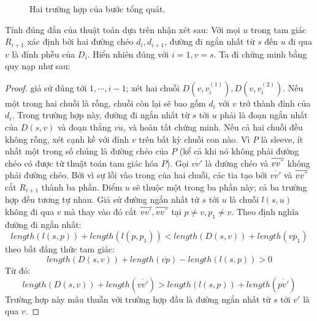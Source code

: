 \begin{figure}[h]
  \caption{Hai trường hợp của bước tổng quát.}
  \label{fig:3} %
\end{figure} 




\hspace{15cm}

Tính đúng đắn của thuật toán dựa trên nhận xét sau: Với mọi $u$ trong tam giác $R_{i+1}$ xác định bởi hai đường chéo $d_i, d_{i+1}$, đường đi ngắn nhất từ $s$ đến $u$ đi qua $v$ là đỉnh phễu của $D_i$. Hiển nhiên đúng với $i = 1, v=s$. Ta đi chứng minh bằng quy nạp như sau:

\begin{proof}
    giả sử đúng tới $1, \cdots, i -1$; xét hai chuỗi $D\left(v, v^{(1)}_i\right), D\left(v, v^{(2)}_i\right)$. Nếu một trong hai chuỗi là rỗng, chuỗi còn lại sẽ bao gồm $d_i$ với $v$ trở thành đỉnh của $d_i$. Trong trường hợp này, đường đi ngắn nhất từ $s$ tới $u$ phải là đoạn ngắn nhất của $D(s,v)$ và đoạn thẳng $\overline{vu}$, và hoàn tất chứng minh. Nếu cả hai chuỗi đều không rỗng, xét cạnh kề với đỉnh $v$ trên bất kỳ chuỗi con nào. Vì $P$ là sleeve, ít nhất một trong số chúng là đường chéo của $P$ (kể cả khi nó không phải đường chéo có được từ thuật toán tam giác hóa $P$). Gọi $\overline{v v'}$ là đường chéo và $\overline{v v^{"}}$ không phải đường chéo. Bởi vì sự lồi vào trong của hai chuỗi, các tia tạo bởi $\overline{v v'}$ và $\overline{v v^{"}}$ cắt $R_{i+1}$ thành ba phần. Điểm $u$ sẽ thuộc một trong ba phần này; cả ba trường hợp đều tương tự nhau. Giả sử đường ngắn nhất từ $s$ tới $u$ là chuỗi $l(s,u)$ không đi qua $v$ mà thay vào đó cắt $\overline{v v^{'}}, \overline{v v^{"}}$ tại $p \neq v, p_1 \neq v$. Theo định nghĩa đường đi ngắn nhất:    
    \[ length\left(l(s,p)\right) + length\left(l(p,p_1)\right) < length\left(D(s,v)\right) + length\left(\overline{v p_1}\right)  \]
    theo bất đẳng thức tam giác: 
    \[ length\left(D(s,v)\right) + length\left(\overline{vp}\right) - length\left(l(s,p)\right) > 0 \]
    Từ đó: 
    \[ length\left(D(s,v)\right) + length\left(\overline{vv'}\right) > length\left(l(s,p)\right) + length\left(\overline{pv'}\right) \]
    Trường hợp này mâu thuẫn với trường hợp đầu là đường ngắn nhất từ $s$ tới $v'$ là qua $v$.
\end{proof}


